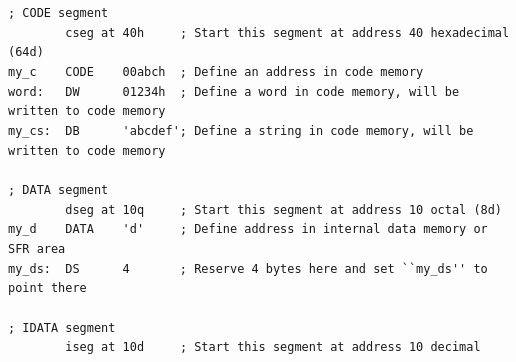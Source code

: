 \documentclass[a4paper,twoside,12pt]{book}
\newcommand{\mysmallfont}{\fontsize{8pt}{10pt} \selectfont{}}
\begin{document}
		\clearpage
		\begin{code}[h!]
			\mysmallfont{}
			{\color{highlight_comment}\verb'; CODE segment'}\\
			\verb'        '{\color{highlight_directive}\verb'cseg'}\verb' '{\color{highlight_constant}\verb'at'}\verb' '{\color{highlight_hex}\verb'40h'}\verb'     '{\color{highlight_comment}\verb'; Start this segment at address 40 hexadecimal (64d)'}\\
			{\color{highlight_constant}\verb'my_c'}\verb'    '{\color{highlight_directive}\verb'CODE'}\verb'    '{\color{highlight_hex}\verb'00abch'}\verb'  '{\color{highlight_comment}\verb'; Define an address in code memory'}\\
			{\color{highlight_label}\verb'word:'}\verb'   '{\color{highlight_directive}\verb'DW'}\verb'      '{\color{highlight_hex}\verb'01234h'}\verb'  '{\color{highlight_comment}\verb'; Define a word in code memory, will be written to code memory'}\\
			{\color{highlight_label}\verb'my_cs:'}\verb'  '{\color{highlight_directive}\verb'DB'}\verb'      '{\color{highlight_string}\verb''\verb"'"\verb'abcdef'\verb"'"\verb''}{\color{highlight_comment}\verb'; Define a string in code memory, will be written to code memory'}\\
			\verb''\\
			{\color{highlight_comment}\verb'; DATA segment'}{\color{highlight_macro}\\
			}\verb'        '{\color{highlight_directive}\verb'dseg'}\verb' '{\color{highlight_constant}\verb'at'}\verb' '{\color{highlight_oct}\verb'10q'}\verb'     '{\color{highlight_comment}\verb'; Start this segment at address 10 octal (8d)'}\\
			{\color{highlight_constant}\verb'my_d'}\verb'    '{\color{highlight_directive}\verb'DATA'}\verb'    '{\color{highlight_char}\verb''\verb"'"\verb'd'\verb"'"\verb''}\verb'     '{\color{highlight_comment}\verb'; Define address in internal data memory or SFR area'}\\
			{\color{highlight_label}\verb'my_ds:'}\verb'  '{\color{highlight_directive}\verb'DS'}\verb'      '{\color{highlight_unknown_base}\verb'4'}\verb'       '{\color{highlight_comment}\verb'; Reserve 4 bytes here and set ``my_ds'\verb"'"\verb''\verb"'"\verb' to point there'}\\
			\verb''\\
			{\color{highlight_comment}\verb'; IDATA segment'}{\color{highlight_constant}\\
			}\verb'        '{\color{highlight_directive}\verb'iseg'}\verb' '{\color{highlight_constant}\verb'at'}\verb' '{\color{highlight_dec}\verb'10d'}\verb'     '{\color{highlight_comment}\verb'; Start this segment at address 10 decimal'}\\

\end{code}
\end{document}
